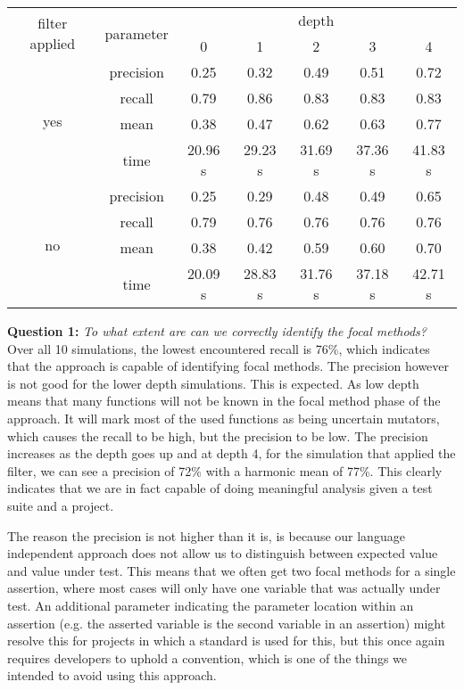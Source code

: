 \documentclass[11pt]{article}
\begin{document}
\begin{multicols}{2}
\begin{table*}[t]
	\centering
	\begin{tabular}{ |c|c|c|c|c|c|c|  }
		\hline
		\multirow{2}{*}{filter applied} & \multirow{2}{*}{parameter} & \multicolumn{5}{|c|}{depth} \\
		\cline{3-7}
		& & 0 & 1 & 2 & 3 & 4\\
		\hline
		\multirow{4}{*}{yes} & precision & 0.25 & 0.32 & 0.49 & 0.51 & 0.72\\
		\cline{2-7}
		& recall & 0.79 & 0.86 & 0.83 & 0.83 & 0.83\\
		\cline{2-7}
		& mean & 0.38 & 0.47 & 0.62 & 0.63 & 0.77\\
		\cline{2-7}
		& time & 20.96 s & 29.23 s &  31.69 s & 37.36 s  & 41.83 s \\
		\hline
		\multirow{4}{*}{no} & precision & 0.25 & 0.29 & 0.48 & 0.49 & 0.65\\
		\cline{2-7}
		& recall & 0.79 & 0.76 & 0.76 & 0.76 & 0.76\\
		\cline{2-7}
		& mean & 0.38 & 0.42 & 0.59 & 0.60 & 0.70\\
		\cline{2-7}
		& time & 20.09 s & 28.83 s &  31.76 s & 37.18 s & 42.71 s \\
		\hline
	\end{tabular}
\end{table*}

\textbf{Question 1:} \textit{To what extent are can we correctly identify the focal methods?}\\
Over all 10 simulations, the lowest encountered recall is 76\%, which indicates that the approach is capable of identifying focal methods. The precision however is not good for the lower depth simulations. This is expected. As low depth means that many functions will not be known in the focal method phase of the approach. It will mark most of the used functions as being uncertain mutators, which causes the recall to be high, but the precision to be low. The precision increases as the depth goes up and at depth 4, for the simulation that applied the filter, we can see a precision of 72\% with a harmonic mean of 77\%. This clearly indicates that we are in fact capable of doing meaningful analysis given a test suite and a project.

The reason the precision is not higher than it is, is because our language independent approach does not allow us to distinguish between expected value and value under test. This means that we often get two focal methods for a single assertion, where most cases will only have one variable that was actually under test. An additional parameter indicating the parameter location within an assertion (e.g. the asserted variable is the second variable in an assertion) might resolve this for projects in which a standard is used for this, but this once again requires developers to uphold a convention, which is one of the things we intended to avoid using this approach.


\end{multicols}
\end{document}
